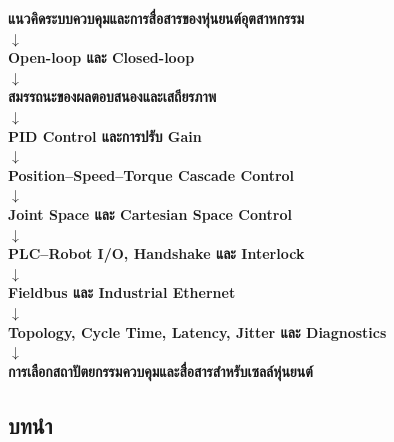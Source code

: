 \begin{center}
\textbf{แนวคิดระบบควบคุมและการสื่อสารของหุ่นยนต์อุตสาหกรรม}\\
\vspace{0.2cm}
$\downarrow$ \\
\vspace{0.2cm}
\textbf{Open-loop และ Closed-loop}\\
\vspace{0.2cm}
$\downarrow$ \\
\vspace{0.2cm}
\textbf{สมรรถนะของผลตอบสนองและเสถียรภาพ}\\
\vspace{0.2cm}
$\downarrow$ \\
\vspace{0.2cm}
\textbf{PID Control และการปรับ Gain}\\
\vspace{0.2cm}
$\downarrow$ \\
\vspace{0.2cm}
\textbf{Position–Speed–Torque Cascade Control}\\
\vspace{0.2cm}
$\downarrow$ \\
\vspace{0.2cm}
\textbf{Joint Space และ Cartesian Space Control}\\
\vspace{0.2cm}
$\downarrow$ \\
\vspace{0.2cm}
\textbf{PLC–Robot I/O, Handshake และ Interlock}\\
\vspace{0.2cm}
$\downarrow$ \\
\vspace{0.2cm}
\textbf{Fieldbus และ Industrial Ethernet}\\
\vspace{0.2cm}
$\downarrow$ \\
\vspace{0.2cm}
\textbf{Topology, Cycle Time, Latency, Jitter และ Diagnostics}\\
\vspace{0.2cm}
$\downarrow$ \\
\vspace{0.2cm}
\textbf{การเลือกสถาปัตยกรรมควบคุมและสื่อสารสำหรับเซลล์หุ่นยนต์}
\end{center}

\newpage

\subsection{บทนำ}

